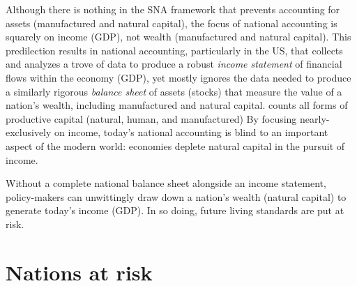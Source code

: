 
Although there is nothing in the SNA framework that prevents 
accounting for assets (manufactured and natural capital),
the focus of national accounting is squarely on income (GDP), 
not wealth (manufactured and natural capital).\cite[p.~415]{UNSNA2008}  
This predilection results in national accounting,
particularly in the US, that collects and analyzes a trove of data to
produce a robust \emph{income statement} of financial flows within the economy (GDP),
yet mostly ignores the data needed to produce a similarly rigorous
\emph{balance sheet} of assets (stocks) that measure the value 
of a nation's wealth, including manufactured and natural capital.
counts all forms of productive capital 
(natural, human, and manufactured)
By focusing nearly-exclusively on income, 
today's national accounting is blind to an important aspect of the modern world:
economies deplete natural capital in the pursuit of income.

\begin{svgraybox}
Without a complete national balance sheet alongside an income statement, 
policy-makers can unwittingly draw down a nation's wealth (natural capital) 
to generate today's income (GDP). 
In so doing, future living standards are put at risk.
\end{svgraybox} 

\section{Nations at risk}

